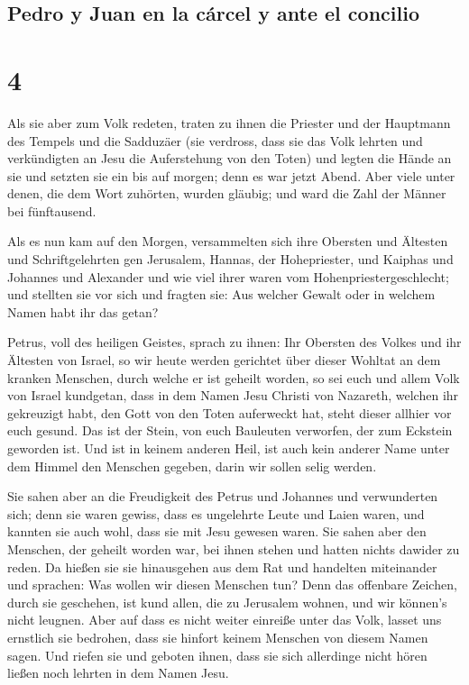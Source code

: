 \hypertarget{pedro-y-juan-en-la-cuxe1rcel-y-ante-el-concilio}{%
\subsection{Pedro y Juan en la cárcel y ante el
concilio}\label{pedro-y-juan-en-la-cuxe1rcel-y-ante-el-concilio}}

\hypertarget{section-3}{%
\section{4}\label{section-3}}

 Als sie aber zum Volk redeten, traten zu ihnen die
Priester und der Hauptmann des Tempels und die Sadduzäer 
(sie verdross, dass sie das Volk lehrten und verkündigten an Jesu die
Auferstehung von den Toten)  und legten die Hände an sie
und setzten sie ein bis auf morgen; denn es war jetzt Abend.
 Aber viele unter denen, die dem Wort zuhörten, wurden
gläubig; und ward die Zahl der Männer bei fünftausend.

 Als es nun kam auf den Morgen, versammelten sich ihre
Obersten und Ältesten und Schriftgelehrten gen Jerusalem, 
Hannas, der Hohepriester, und Kaiphas und Johannes und Alexander und wie
viel ihrer waren vom Hohenpriestergeschlecht;  und
stellten sie vor sich und fragten sie: Aus welcher Gewalt oder in
welchem Namen habt ihr das getan?

 Petrus, voll des heiligen Geistes, sprach zu ihnen: Ihr
Obersten des Volkes und ihr Ältesten von Israel,  so wir
heute werden gerichtet über dieser Wohltat an dem kranken Menschen,
durch welche er ist geheilt worden,  so sei euch und
allem Volk von Israel kundgetan, dass in dem Namen Jesu Christi von
Nazareth, welchen ihr gekreuzigt habt, den Gott von den Toten auferweckt
hat, steht dieser allhier vor euch gesund.  Das ist der
Stein, von euch Bauleuten verworfen, der zum Eckstein geworden ist.
 Und ist in keinem anderen Heil, ist auch kein anderer
Name unter dem Himmel den Menschen gegeben, darin wir sollen selig
werden.

 Sie sahen aber an die Freudigkeit des Petrus und
Johannes und verwunderten sich; denn sie waren gewiss, dass es
ungelehrte Leute und Laien waren, und kannten sie auch wohl, dass sie
mit Jesu gewesen waren.  Sie sahen aber den Menschen, der
geheilt worden war, bei ihnen stehen und hatten nichts dawider zu reden.
 Da hießen sie sie hinausgehen aus dem Rat und handelten
miteinander und sprachen:  Was wollen wir diesen Menschen
tun? Denn das offenbare Zeichen, durch sie geschehen, ist kund allen,
die zu Jerusalem wohnen, und wir können's nicht leugnen. 
Aber auf dass es nicht weiter einreiße unter das Volk, lasset uns
ernstlich sie bedrohen, dass sie hinfort keinem Menschen von diesem
Namen sagen.  Und riefen sie und geboten ihnen, dass sie
sich allerdinge nicht hören ließen noch lehrten in dem Namen Jesu.

